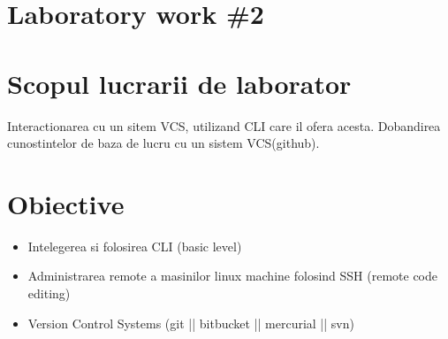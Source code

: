 \section*{Laboratory work \#2}

\section{Scopul lucrarii de laborator}
Interactionarea cu un sitem VCS, utilizand CLI care il ofera acesta. Dobandirea cunostintelor de baza de lucru cu un sistem VCS(github).
\section{Obiective}

\begin{itemize}
\item Intelegerea si folosirea CLI (basic level)
\item Administrarea remote a masinilor linux machine folosind SSH (remote code editing)
\item Version Control Systems (git || bitbucket || mercurial || svn)
	\end{itemize}

\clearpage